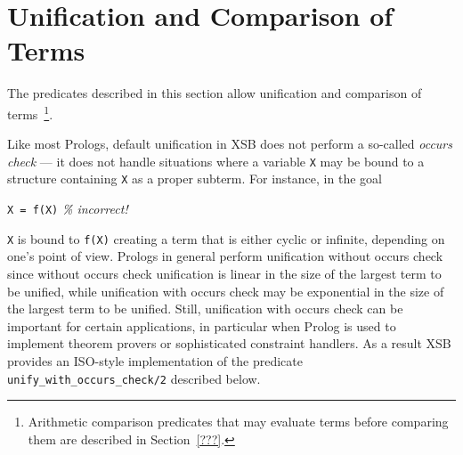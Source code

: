 \section{Unification and Comparison of Terms} \label{Comparison}

The predicates described in this section allow unification and
comparison of terms~\footnote{Arithmetic comparison predicates that
may evaluate terms before comparing them are described in
Section~\ref{???}.}.

Like most Prologs, default unification in XSB does not perform a
so-called {\em occurs check} --- it does not handle situations where a
variable {\tt X} may be bound to a structure containing {\tt X} as a
proper subterm.  For instance, in the goal

{\tt X = f(X)}    {\em \% incorrect!}

{\tt X} is bound to {\tt f(X)} creating a term that is either cyclic
or infinite, depending on one's point of view.  Prologs in general
perform unification without occurs check since without occurs check
unification is linear in the size of the largest term to be unified,
while unification with occurs check may be exponential in the size of
the largest term to be unified.  Still, unification with occurs check
can be important for certain applications, in particular when Prolog
is used to implement theorem provers or sophisticated constraint
handlers.  As a result XSB provides an ISO-style implementation of the
predicate {\tt unify\_with\_occurs\_check/2} described below.

